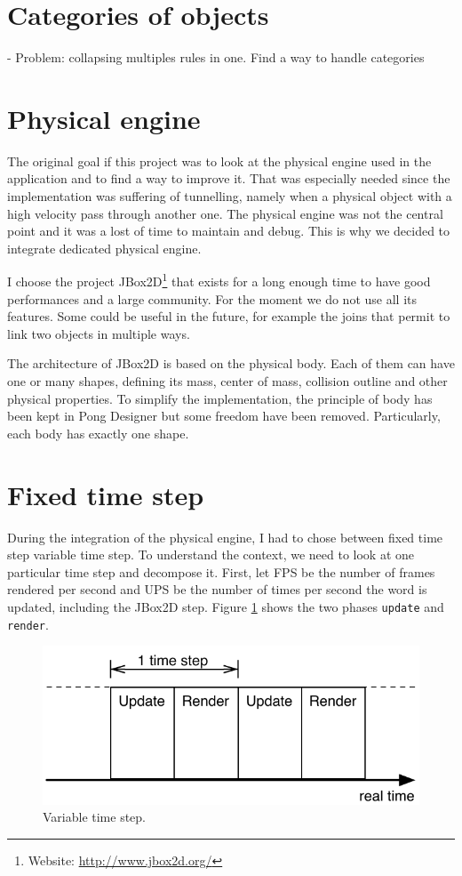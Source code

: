 \documentclass[11pt,a4paper]{article}
\begin{document}
\section{Categories of objects}

- Problem: collapsing multiples rules in one. Find a way to handle categories


\section{Physical engine}
The original goal if this project was to look at the physical engine used in the application and to find a way to improve it. That was especially needed since the implementation was suffering of tunnelling, namely when a physical object with a high velocity pass through another one. The physical engine was not the central point and it was a lost of time to maintain and debug. This is why we decided to integrate dedicated physical engine. 

I choose the project JBox2D\footnote{Website: \url{http://www.jbox2d.org/}} that exists for a long enough time to have good performances and a large community. For the moment we do not use all its features. Some could be useful in the future, for example the joins that permit to link two objects in multiple ways.

The architecture of JBox2D is based on the physical body. Each of them can have one or many shapes, defining its mass, center of mass, collision outline and other physical properties. To simplify the implementation, the principle of body has been kept in Pong Designer but some freedom have been removed. Particularly, each body has exactly one shape.

\section{Fixed time step}
During the integration of the physical engine, I had to chose between fixed time step variable time step. To understand the context, we need to look at one particular time step and decompose it. First, let FPS be the number of frames rendered per second and UPS be the number of times per second the word is updated, including the JBox2D step. Figure \ref{fig:variableTimeStep} shows the two phases \texttt{update} and \texttt{render}. 

\begin{figure}[h]
\centering
\includegraphics[scale = 0.8]{images/variableTimeStep} 
\caption{Variable time step.}
\label{fig:variableTimeStep}
\end{figure}
\end{document}
